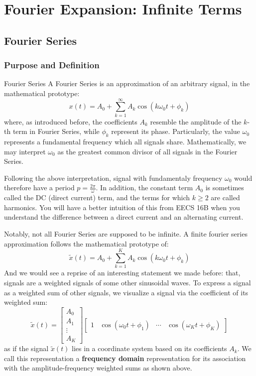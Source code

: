 \chapter{Fourier Expansion: Infinite Terms}

\section{Fourier Series}
\subsection{Purpose and Definition}
\begin{ln-define}{Fourier Series}{}
    A Fourier Series is an approximation of an arbitrary signal, in the mathematical prototype:
    \[
        x(t) = A_0 + \sum_{k=1}^\infty A_k \cos(k \omega_0 t + \phi_k)
    \]
    where, as introduced before, the coefficients $A_k$ resemble the amplitude of the $k$-th term in Fourier Series, while $\phi_k$ represent its phase.
    Particularly, the value $\omega_0$ represents a fundamental frequency which all signals share.
    Mathematically, we may interpret $\omega_0$ as the greatest common divisor of all signals in the Fourier Series.
\end{ln-define}
Following the above interpretation, signal with fundamentaly frequency $\omega_0$ would therefore have a period $p = \frac{2\pi}{\omega}$.
In addition, the constant term $A_0$ is sometimes called the DC (direct current) term, and the terms for which $k \geq 2$ are called harmonics.
You will have a better intuition of this from EECS 16B when you understand the difference between a direct current and an alternating current.

Notably, not all Fourier Series are supposed to be infinite. A finite fourier series approximation follows the mathematical prototype of:
\[
    \tilde{x}(t) = A_0 + \sum_{k = 1}^K A_k \cos(k \omega_0 t + \phi_k)
\]
And we would see a reprise of an interesting statement we made before: that, signals are a weighted signals of some other sinusoidal waves.
To express a signal as a weighted sum of other signals, we visualize a signal via the coefficient of its weighted sum:
\[
    \tilde{x}(t) = \begin{bmatrix} A_0 \\ A_1 \\ \vdots \\ A_K \end{bmatrix} \begin{bmatrix} 1 & \cos(\omega_0 t + \phi_1) & \cdots & \cos(\omega_K t + \phi_K) \end{bmatrix}
\]
as if the signal $\tilde{x}(t)$ lies in a coordinate system based on its coefficients $A_k$. We call this representation a \textbf{frequency domain} representation for its association with the amplitude-frequency weighted sums as shown above.

